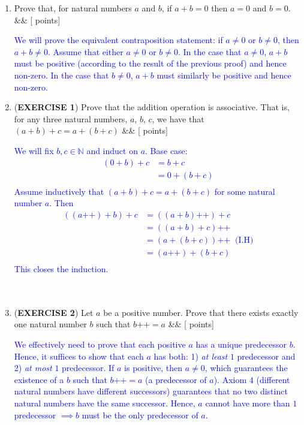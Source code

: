 \documentclass[12pt]{article}
\newcommand{\points}[1]{\hfill {[#1 points]}}
\newcommand{\problem}[2][]{%
  \item {#2}%
  \ifx&#1&%
  \else%
    \points{#1}%
  \fi
  \par\vspace{0.5em}
}
\begin{document}
\begin{enumerate}[leftmargin=*, label=\textbf{\arabic*.}]
	\problem{Prove that, for natural numbers $a$ and $b$, if $a + b = 0$ then $a = 0$ and $b = 0$.}
	\textcolor{blue}{We will prove the equivalent contraposition statement: if $a \neq 0$ or $b \neq 0$, then $a + b \neq 0$. Assume that either $a \neq 0$ or $b \neq 0$. In the case that $a \neq 0$, $a+b$ must be positive (according to the result of the previous proof) and hence non-zero. In the case that $b \neq 0$, $a+b$ must similarly be positive and hence non-zero.}
	
    \problem{(\textbf{EXERCISE 1}) Prove that the addition operation is associative. That is, for any three natural numbers, $a$, $b$, $c$, we have that $(a+b)+c = a+(b+c)$}
    	\textcolor{blue}{We will fix $b,c \in \mathbb{N}$ and induct on $a$. Base case:
	\begin{align*}
	(0 + b) + c &=b + c \\
	&= 0 + (b + c)\\
	\end{align*}
	Assume inductively that $(a + b) + c = a + (b + c)$ for some natural number $a$. Then
	\begin{align*}
	((a\text{++}) + b) + c &= ((a + b)\text{++}) + c\\
	&= ((a+b) + c)\text{++}  \\
	& = (a + (b + c))\text{++} \;\; \text{(I.H)} \\
	&= (a\text{++}) + (b+c) \\
	\end{align*}
	This closes the induction.}
	\\ \\ \\
	\problem{(\textbf{EXERCISE 2}) Let $a$ be a positive number. Prove that there exists exactly one natural number $b$ such that $b\text{++} = a$}
	\textcolor{blue}{ 
	We effectively need to prove that each positive $a$ has a unique predecessor $b$. Hence, it suffices to show that each $a$ has both: 1) \textit{at least} $1$ predecessor and 2) \textit{at most} $1$ predecessor. If $a$ is positive, then $a \neq 0$, which guarantees the existence of a $b$ such that $b\text{++} = a$ (a predecessor of $a$). Axiom $4$ (different natural numbers have different successors) guarantees that no two distinct natural numbers have the same successor. Hence, $a$ cannot have more than $1$ predecessor $\implies b$ must be the only predecessor of $a$.  \\ \\ \\
}
\end{enumerate}
\end{document}
